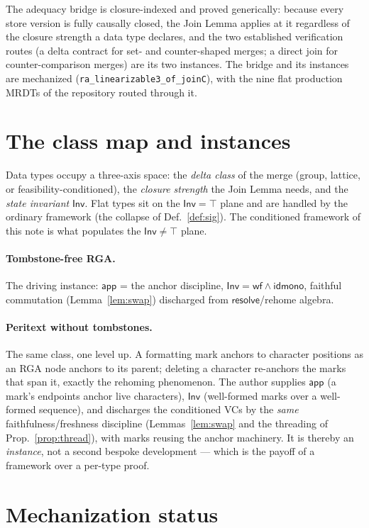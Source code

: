 \documentclass[11pt]{article}
\newcommand{\Inv}{\mathsf{Inv}}
\newcommand{\app}{\mathsf{app}}
\newcommand{\resolve}{\mathsf{resolve}}
\newcommand{\lean}[1]{\texttt{\small #1}}
\begin{document}
The adequacy bridge is closure-indexed and proved generically: because every
store version is fully causally closed, the Join Lemma applies at it regardless
of the closure strength a data type declares, and the two established
verification routes (a delta contract for set- and counter-shaped merges; a
direct join for counter-comparison merges) are its two instances. The bridge and
its instances are mechanized (\lean{ra\_linearizable3\_of\_joinC}), with the nine
flat production MRDTs of the repository routed through it.

\section{The class map and instances}
\label{sec:instances}

Data types occupy a three-axis space: the \emph{delta class} of the merge (group,
lattice, or feasibility-conditioned), the \emph{closure strength} the Join Lemma
needs, and the \emph{state invariant} $\Inv$. Flat types sit on the $\Inv=\top$
plane and are handled by the ordinary framework (the collapse of
Def.~\ref{def:sig}). The conditioned framework of this note is what populates the
$\Inv\neq\top$ plane.

\paragraph{Tombstone-free RGA.} The driving instance: $\app$ = the anchor
discipline, $\Inv=\mathsf{wf}\wedge\mathsf{idmono}$, faithful commutation
(Lemma~\ref{lem:swap}) discharged from $\resolve$/rehome algebra.

\paragraph{Peritext without tombstones.} The same class, one level up. A
formatting mark anchors to character positions as an RGA node anchors to its
parent; deleting a character re-anchors the marks that span it, exactly the
rehoming phenomenon. The author supplies $\app$ (a mark's endpoints anchor live
characters), $\Inv$ (well-formed marks over a well-formed sequence), and
discharges the conditioned VCs by the \emph{same} faithfulness/freshness
discipline (Lemmas~\ref{lem:swap} and the threading of
Prop.~\ref{prop:thread}), with marks reusing the anchor machinery. It is thereby
an \emph{instance}, not a second bespoke development --- which is the payoff of a
framework over a per-type proof.

\section{Mechanization status}
\label{sec:status}
\end{document}
